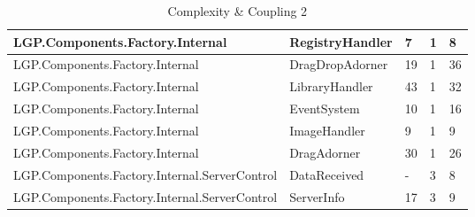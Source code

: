 \begin{table}[h!t]
{\begin{tabular}{ | p{82mm} | p{32mm} | p{10mm} | p{10mm} | p{10mm} | }
				LGP.Components.Factory.Internal & RegistryHandler & 7     & 1     & 8  \\ \hline
				LGP.Components.Factory.Internal & DragDropAdorner & 19    & 1     & 36  \\ \hline
				LGP.Components.Factory.Internal & LibraryHandler & 43    & 1     & 32  \\ \hline
				LGP.Components.Factory.Internal & EventSystem & 10    & 1     & 16  \\ \hline
				LGP.Components.Factory.Internal & ImageHandler & 9     & 1     & 9  \\ \hline
				LGP.Components.Factory.Internal & DragAdorner & 30    & 1     & 26  \\ \hline
				LGP.Components.Factory.Internal.ServerControl & DataReceived & -     & 3     & 8  \\ \hline
				LGP.Components.Factory.Internal.ServerControl & ServerInfo & 17    & 3     & 9  \\ \hline
				\end{tabular}}
				
				\caption{Complexity \& Coupling 2}			
				\label{tab:ComplexityCoupling2}
				
			\end{table}
			
		\newpage
			
